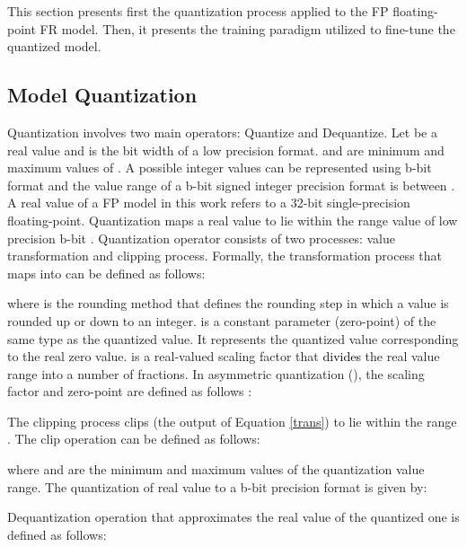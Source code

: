 \documentclass[a4paper,conference]{IEEEtran}
\begin{document}
This section presents first the quantization process applied to the FP floating-point FR model. Then, it presents the training paradigm utilized to fine-tune the quantized model.

\vspace{-1mm}
\subsection{Model Quantization}
\vspace{-1mm}
Quantization involves two main operators: Quantize and Dequantize.   
Let  be a real value and  is the bit width of a low precision format.  
 and  are minimum and maximum values of .
A  possible integer values can be represented using  b-bit format and the value range of a b-bit signed integer precision format is between \textcolor{black}{ }. 
A real value of a FP model in this work refers to a 32-bit single-precision floating-point.
Quantization maps a real value  to lie within the range value of low precision b-bit \textcolor{black}{}. 
Quantization operator consists of two processes: value transformation and clipping process. Formally, the transformation process that maps  into  can be defined as follows:
\vspace{-1mm}

where  is the rounding method that defines the rounding step in which a value is rounded up or down to an integer.  is a constant parameter (zero-point) of the same type as the quantized value. 
It represents the quantized value  corresponding to the real zero value. 
 is a real-valued scaling factor that \textcolor{black}{divides} the real value range into a number of fractions. 
In asymmetric quantization (), the scaling factor  and zero-point are defined as follows \cite{DBLP:conf/cvpr/JacobKCZTHAK18}:
\vspace{-1mm}

\vspace{-1mm}

The clipping process clips  (the output of Equation \ref{trans}) to lie within the range \textcolor{black}{}. The clip operation can be defined as follows:
\vspace{-1mm}

\vspace{-1mm}
where  and  are the minimum and maximum values of the quantization value range. 
The quantization of real value  to a b-bit precision format is given by:
\vspace{-1mm}

Dequantization operation that approximates the real value of the quantized one is defined as follows:
\vspace{-1mm}
\end{document}
